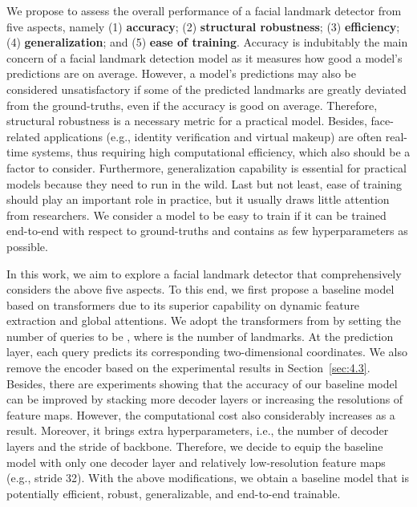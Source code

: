 \documentclass{article}
\begin{document}
We propose to assess the overall performance of a facial landmark detector from five aspects, namely (1) \textbf{accuracy}; (2) \textbf{structural robustness}; (3) \textbf{efficiency}; (4) \textbf{generalization}; and (5) \textbf{ease of training}. Accuracy is indubitably the main concern of a facial landmark detection model as it measures how good a model's predictions are on average. However, a model's predictions may also be considered unsatisfactory if some of the predicted landmarks are greatly deviated from the ground-truths, even if the accuracy is good on average. Therefore, structural robustness is a necessary metric for a practical model. Besides, face-related applications (e.g., identity verification and virtual makeup) are often real-time systems, thus requiring high computational efficiency, which also should be a factor to consider. Furthermore, generalization capability is essential for practical models because they need to run in the wild. Last but not least, ease of training should play an important role in practice, but it usually draws little attention from researchers. We consider a model to be easy to train if it can be trained end-to-end with respect to ground-truths and contains as few hyperparameters as possible. 


In this work, we aim to explore a facial landmark detector that comprehensively considers the above five aspects. To this end, we first propose a baseline model based on transformers due to its superior capability on dynamic feature extraction and global attentions. We adopt the transformers from \citep{CMS20} by setting the number of queries to be , where  is the number of landmarks. At the prediction layer, each query predicts its corresponding two-dimensional coordinates. We also remove the encoder based on the experimental results in Section~\ref{sec:4.3}. Besides, there are experiments showing that the accuracy of our baseline model can be improved by stacking more decoder layers or increasing the resolutions of feature maps. However, the computational cost also considerably increases as a result. Moreover, it brings extra hyperparameters, i.e., the number of decoder layers and the stride of backbone. Therefore, we decide to equip the baseline model with only one decoder layer and relatively low-resolution feature maps (e.g., stride 32). With the above modifications, we obtain a baseline model that is potentially efficient, robust, generalizable, and end-to-end trainable.
\end{document}
